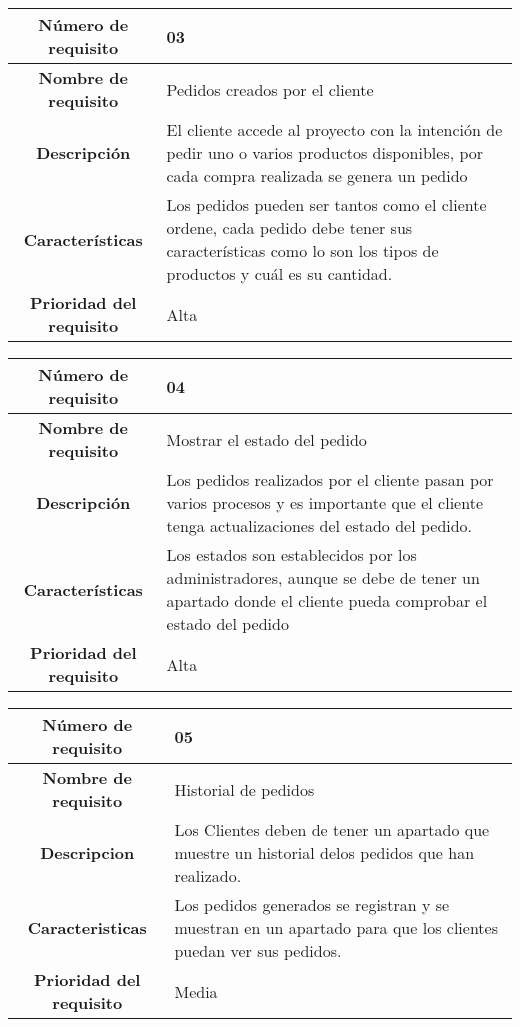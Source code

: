 \documentclass[12pt,a4paper, twosite]{article}
\begin{document}
\begin{center}
    \begin{tabular}{|c|p{6cm}|}
        \hline
        \textbf{Número de requisito} & 03 \\
        \hline
        \textbf{Nombre de requisito} & Pedidos creados por el cliente \\
        \hline
        \textbf{Descripción} & El cliente accede al proyecto con la intención de pedir uno o varios productos disponibles, por cada compra realizada se genera un pedido \\
        \hline
        \textbf{Características} & Los pedidos pueden ser tantos como el cliente ordene, cada pedido debe tener sus características como lo son los tipos de productos y cuál es su cantidad.  \\
        \hline
        \textbf{Prioridad del requisito} & Alta  \\
        \hline
     \end{tabular}
\end{center}

\begin{center}
    \begin{tabular}{|c|p{6cm}|}
        \hline
        \textbf{Número de requisito} & 04 \\ 
        \hline
        \textbf{Nombre de requisito} & Mostrar el estado del pedido \\
        \hline
        \textbf{Descripción} & Los pedidos realizados por el cliente pasan por varios procesos y es importante que el cliente tenga actualizaciones del estado del pedido.  \\
        \hline
        \textbf{Características} & Los estados son establecidos por los administradores, aunque se debe de tener un apartado donde el cliente pueda comprobar el estado del pedido\\
        \hline
        \textbf{Prioridad del requisito} & Alta  \\
        \hline
     \end{tabular}
\end{center}

\begin{center}
    \begin{tabular}{|c|p{6cm}|}
        \hline
        \textbf{Número de requisito} & 05 \\ 
        \hline
        \textbf{Nombre de requisito} & Historial de pedidos \\
        \hline
        \textbf{Descripcion} & Los Clientes deben de tener un apartado que muestre un historial delos pedidos que han realizado. \\
        \hline
        \textbf{Caracteristicas} & Los pedidos generados se registran y se muestran en un apartado para que los clientes puedan ver sus pedidos. \\
        \hline
        \textbf{Prioridad del requisito} & Media  \\
        \hline
     \end{tabular}
\end{center}
\end{document}
